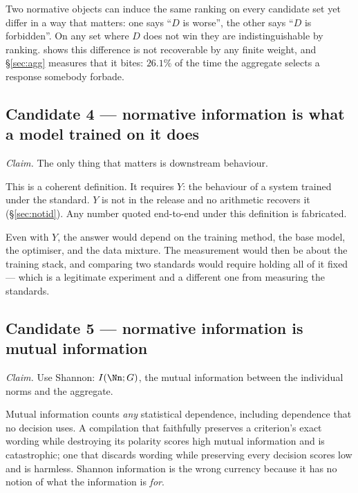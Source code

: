 \begin{proposition}
\label{prop:cand3b}
Two normative objects can induce the same ranking on every candidate set yet
differ in a way that matters: one says ``$D$ is worse'', the other says ``$D$ is
forbidden''. On any set where $D$ does not win they are indistinguishable by
ranking.  shows this difference is not recoverable by any finite
weight, and §\ref{sec:agg} measures that it bites: $26.1\%$ of the time the
aggregate selects a response somebody forbade.
\end{proposition}

\subsection{Candidate 4 --- normative information is what a model trained on it does}

\emph{Claim.} The only thing that matters is downstream behaviour.

\begin{proposition}
This is a coherent definition. It requires $Y$: the behaviour of a system trained
under the standard. $Y$ is not in the release and no arithmetic recovers it
(§\ref{sec:notid}). Any number quoted end-to-end under this definition is
fabricated.
\end{proposition}

\begin{remark}
Even with $Y$, the answer would depend on the training method, the base model,
the optimiser, and the data mixture. The measurement would then be about the
training stack, and comparing two standards would require holding all of it
fixed --- which is a legitimate experiment and a different one from measuring the
standards.
\end{remark}

\subsection{Candidate 5 --- normative information is mutual information}

\emph{Claim.} Use Shannon: $I(\Nn; G)$, the mutual information between the
individual norms and the aggregate.

\begin{proposition}
Mutual information counts \emph{any} statistical dependence, including
dependence that no decision uses. A compilation that faithfully preserves a
criterion's exact wording while destroying its polarity scores high mutual
information and is catastrophic; one that discards wording while preserving every
decision scores low and is harmless. Shannon information is the wrong currency
because it has no notion of what the information is \emph{for}.
\end{proposition}

